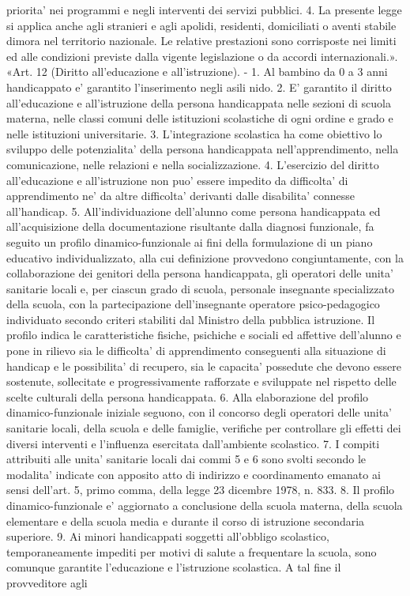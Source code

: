     priorita' nei programmi e negli interventi dei servizi pubblici. 4. La presente legge si applica anche agli stranieri e agli apolidi, residenti, domiciliati o aventi stabile dimora nel territorio nazionale. Le relative prestazioni sono corrisposte nei limiti ed alle condizioni previste dalla vigente legislazione o da accordi internazionali.». «Art. 12 (Diritto all'educazione e all'istruzione). - 1. Al bambino da 0 a 3 anni handicappato e' garantito l'inserimento negli asili nido. 2. E' garantito il diritto all'educazione e all'istruzione della persona handicappata nelle sezioni di scuola materna, nelle classi comuni delle istituzioni scolastiche di ogni ordine e grado e nelle istituzioni universitarie. 3. L'integrazione scolastica ha come obiettivo lo sviluppo delle potenzialita' della persona handicappata nell'apprendimento, nella comunicazione, nelle relazioni e nella socializzazione. 4. L'esercizio del diritto all'educazione e all'istruzione non puo' essere impedito da difficolta' di apprendimento ne' da altre difficolta' derivanti dalle disabilita' connesse all'handicap. 5. All'individuazione dell'alunno come persona handicappata ed all'acquisizione della documentazione risultante dalla diagnosi funzionale, fa seguito un profilo dinamico-funzionale ai fini della formulazione di un piano educativo individualizzato, alla cui definizione provvedono congiuntamente, con la collaborazione dei genitori della persona handicappata, gli operatori delle unita' sanitarie locali e, per ciascun grado di scuola, personale insegnante specializzato della scuola, con la partecipazione dell'insegnante operatore psico-pedagogico individuato secondo criteri stabiliti dal Ministro della pubblica istruzione. Il profilo indica le caratteristiche fisiche, psichiche e sociali ed affettive dell'alunno e pone in rilievo sia le difficolta' di apprendimento conseguenti alla situazione di handicap e le possibilita' di recupero, sia le capacita' possedute che devono essere sostenute, sollecitate e progressivamente rafforzate e sviluppate nel rispetto delle scelte culturali della persona handicappata. 6. Alla elaborazione del profilo dinamico-funzionale iniziale seguono, con il concorso degli operatori delle unita' sanitarie locali, della scuola e delle famiglie, verifiche per controllare gli effetti dei diversi interventi e l'influenza esercitata dall'ambiente scolastico. 7. I compiti attribuiti alle unita' sanitarie locali dai commi 5 e 6 sono svolti secondo le modalita' indicate con apposito atto di indirizzo e coordinamento emanato ai sensi dell'art. 5, primo comma, della legge 23 dicembre 1978, n. 833. 8. Il profilo dinamico-funzionale e' aggiornato a conclusione della scuola materna, della scuola elementare e della scuola media e durante il corso di istruzione secondaria superiore. 9. Ai minori handicappati soggetti all'obbligo scolastico, temporaneamente impediti per motivi di salute a frequentare la scuola, sono comunque garantite l'educazione e l'istruzione scolastica. A tal fine il provveditore agli
